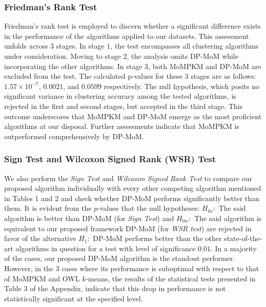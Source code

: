\documentclass{article}
\begin{document}
\subsubsection{Friedman's Rank Test} 
Friedman's rank test \citep{friedman} is employed to discern whether a significant difference exists in the performance of the algorithms applied to our datasets. This assessment unfolds across 3 stages. In stage $1$, the test encompasses all clustering algorithms under consideration. Moving to stage $2$, the analysis omits DP-MoM while incorporating the other algorithms. In stage $3$, both MoMPKM and DP-MoM are excluded from the test. The calculated p-values for these 3 stages are as follows: $1.57 \times 10^{-7}$, $0.0021$, and $0.0599$ respectively. The null hypothesis, which posits no significant variance in clustering accuracy among the tested algorithms, is rejected in the first and second stages, but accepted in the third stage. This outcome underscores that MoMPKM and DP-MoM emerge as the most proficient algorithms at our disposal. Further assessments indicate that MoMPKM is outperformed comprehensively by DP-MoM. 

\subsubsection{Sign Test and Wilcoxon Signed Rank (WSR) Test}

We also perform the \textit{Sign Test} and \textit{Wilcoxon Signed Rank Test} to compare our proposed algorithm individually with every other competing algorithm mentioned in Tables 1 and 2 and check whether DP-MoM performs significantly better than them. It is evident from the $p$-values that the null hypotheses: $H_{0s}:$ The said algorithm is better than DP-MoM (for \textit{Sign Test}) and $H_{0w}:$ The said algorithm is equivalent to our proposed framework DP-MoM (for \textit{WSR test}) are rejected in favor of the alternative $H_1:$ DP-MoM performs better than the other state-of-the-art algorithms in question for a test with level of significance $0.01$. In a majority of the cases, our proposed DP-MoM algorithm is the standout performer. However, in the 3 cases where its performance is suboptimal with respect to that of MoMPKM and OWL $k$-means, the results of the statistical tests presented in Table 3 of the Appendix, indicate that this drop in performance is not statistically significant at the specified level.

\end{document}

